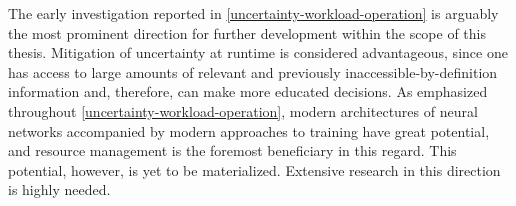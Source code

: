 The early investigation reported in \cref{uncertainty-workload-operation} is
arguably the most prominent direction for further development within the scope
of this thesis. Mitigation of uncertainty at runtime is considered advantageous,
since one has access to large amounts of relevant and previously
inaccessible-by-definition information and, therefore, can make more educated
decisions. As emphasized throughout \cref{uncertainty-workload-operation},
modern architectures of neural networks accompanied by modern approaches to
training have great potential, and resource management is the foremost
beneficiary in this regard. This potential, however, is yet to be materialized.
Extensive research in this direction is highly needed.
